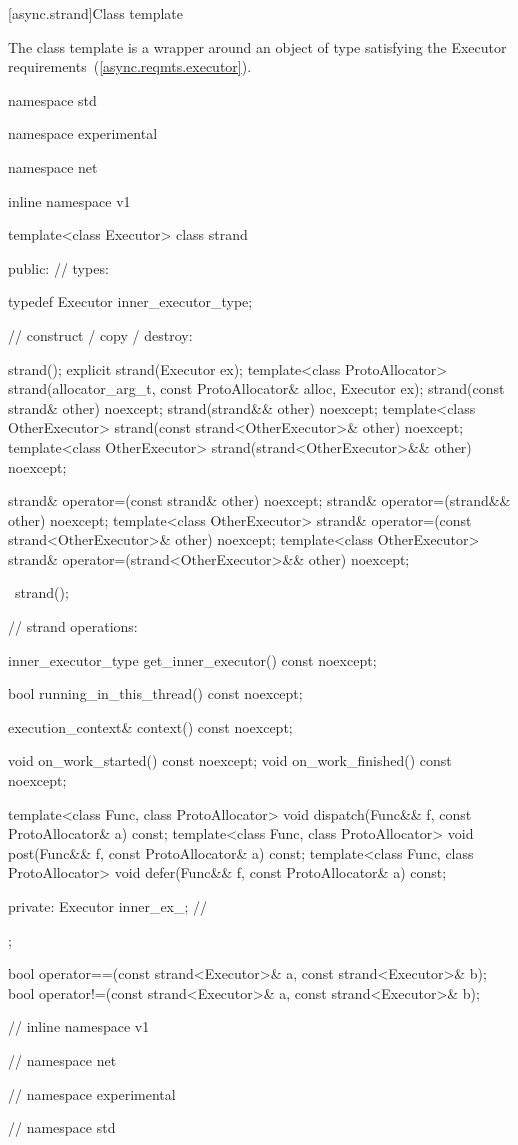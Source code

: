 [async.strand]{Class template }

\pnum
The class template  is a wrapper around an object of type  satisfying the Executor requirements~(\ref{async.reqmts.executor}).

\begin{codeblock}
namespace std {
namespace experimental {
namespace net {
inline namespace v1 {

  template<class Executor>
  class strand
  {
  public:
    // types:

    typedef Executor inner_executor_type;

    // construct / copy / destroy:

    strand();
    explicit strand(Executor ex);
    template<class ProtoAllocator>
      strand(allocator_arg_t, const ProtoAllocator& alloc, Executor ex);
    strand(const strand& other) noexcept;
    strand(strand&& other) noexcept;
    template<class OtherExecutor> strand(const strand<OtherExecutor>& other) noexcept;
    template<class OtherExecutor> strand(strand<OtherExecutor>&& other) noexcept;

    strand& operator=(const strand& other) noexcept;
    strand& operator=(strand&& other) noexcept;
    template<class OtherExecutor> strand& operator=(const strand<OtherExecutor>& other) noexcept;
    template<class OtherExecutor> strand& operator=(strand<OtherExecutor>&& other) noexcept;

    ~strand();

    // strand operations:

    inner_executor_type get_inner_executor() const noexcept;

    bool running_in_this_thread() const noexcept;

    execution_context& context() const noexcept;

    void on_work_started() const noexcept;
    void on_work_finished() const noexcept;

    template<class Func, class ProtoAllocator>
      void dispatch(Func&& f, const ProtoAllocator& a) const;
    template<class Func, class ProtoAllocator>
      void post(Func&& f, const ProtoAllocator& a) const;
    template<class Func, class ProtoAllocator>
      void defer(Func&& f, const ProtoAllocator& a) const;

  private:
    Executor inner_ex_; // \expos
  };

  bool operator==(const strand<Executor>& a, const strand<Executor>& b);
  bool operator!=(const strand<Executor>& a, const strand<Executor>& b);

} // inline namespace v1
} // namespace net
} // namespace experimental
} // namespace std
\end{codeblock}

